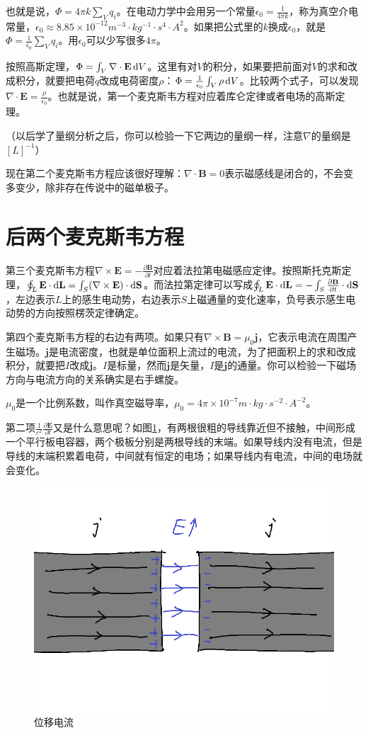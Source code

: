 也就是说，$\Phi=4 \pi k \sum_V q_i$。在电动力学中会用另一个常量$\epsilon_0=\frac{1}{4 \pi k}$，称为真空介电常量，$\epsilon_0 \approx 8.85 \times 10^{-12} \unit{m^{-3} \cdot kg^{-1} \cdot s^4 \cdot A^2}$。如果把公式里的$k$换成$\epsilon_0$，就是$\Phi=\frac{1}{\epsilon_0} \sum_V q_i$。用$\epsilon_0$可以少写很多$4 \pi$。

按照高斯定理，$\Phi=\int_V \nabla \cdot \mathbf{E} \mathop{}\!\mathrm{d} V$。这里有对$V$的积分，如果要把前面对$V$的求和改成积分，就要把电荷$q$改成电荷密度$\rho$：$\Phi=\frac{1}{\epsilon_0} \int_V \rho \mathop{}\!\mathrm{d} V$。比较两个式子，可以发现$\nabla \cdot \mathbf{E}=\frac{\rho}{\epsilon_0}$。也就是说，第一个麦克斯韦方程对应着库仑定律或者电场的高斯定理。

（以后学了量纲分析之后，你可以检验一下它两边的量纲一样，注意$\nabla$的量纲是$[L]^{-1}$）

现在第二个麦克斯韦方程应该很好理解：$\nabla \cdot \mathbf{B}=0$表示磁感线是闭合的，不会变多变少，除非存在传说中的磁单极子。
\section{后两个麦克斯韦方程}
第三个麦克斯韦方程$\nabla \times \mathbf{E}=-\frac{\partial \mathbf{B}}{\partial t}$对应着法拉第电磁感应定律。按照斯托克斯定理，$\oint_L \mathbf{E} \cdot \mathop{}\!\mathrm{d} \mathbf{L}=\int_S (\nabla \times \mathbf{E}) \cdot \mathop{}\!\mathrm{d} \mathbf{S}$。而法拉第定律可以写成$\oint_L \mathbf{E} \cdot \mathop{}\!\mathrm{d} \mathbf{L}=-\int_S \frac{\partial \mathbf{B}}{\partial t} \cdot \mathop{}\!\mathrm{d} \mathbf{S}$，左边表示$L$上的感生电动势，右边表示$S$上磁通量的变化速率，负号表示感生电动势的方向按照楞茨定律确定。

第四个麦克斯韦方程的右边有两项。如果只有$\nabla \times \mathbf{B}=\mu_0 \mathbf{j}$，它表示电流在周围产生磁场。$\mathbf{j}$是电流密度，也就是单位面积上流过的电流，为了把面积上的求和改成积分，就要把$I$改成$\mathbf{j}$。$I$是标量，然而$\mathbf{j}$是矢量，$I$是$\mathbf{j}$的通量。你可以检验一下磁场方向与电流方向的关系确实是右手螺旋。

$\mu_0$是一个比例系数，叫作真空磁导率，$\mu_0=4 \pi \times 10^{-7} \unit{m \cdot kg \cdot s^{-2} \cdot A^{-2}}$。

第二项$\frac{1}{c^2} \frac{\partial \mathbf{E}}{\partial t}$又是什么意思呢？如图\ref{fig-disp-curr}，有两根很粗的导线靠近但不接触，中间形成一个平行板电容器，两个极板分别是两根导线的末端。如果导线内没有电流，但是导线的末端积累着电荷，中间就有恒定的电场；如果导线内有电流，中间的电场就会变化。
\begin{figure}[htb]
\centering
\includegraphics[width=0.33\linewidth]{fig/disp-curr.png}
\caption{位移电流}
\label{fig-disp-curr}
\end{figure}

